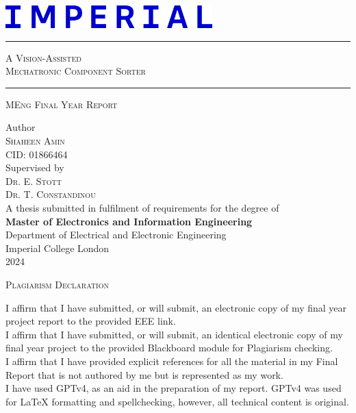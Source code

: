 \documentclass[12pt, a4paper]{article}
\begin{document}
\begin{titlepage}
  \noindent
  \includegraphics[width=80mm]{imgs/icl_logo.png}

  \centering
  \vspace{3.5cm}

  \rule{\textwidth}{0.5pt}
  \huge \textsc{A Vision-Assisted\\Mechatronic Component Sorter}
  \rule{\textwidth}{0.5pt}

  \vspace{1cm}
  \LARGE \textsc{MEng Final Year Report}
  
  \vspace{3cm}
  \large  Author\\
  \Large  \textsc{Shaheen Amin}\\
  \Large CID: 01866464\\

  \vspace{1.5cm}
  \large Supervised by\\
  \Large \textsc{Dr. E. Stott}\\
  \Large \textsc{Dr. T. Constandinou}\\

  \vfill
  \normalsize
  A thesis submitted in fulfilment of requirements for the degree of\\
  \textbf{Master of Electronics and Information Engineering}\\
  
  \vspace{0.5cm}
  \normalsize
  Department of Electrical and Electronic Engineering\\
  Imperial College London\\
  2024
  \vspace{1cm}
\end{titlepage}

\newpage
\vspace*{\fill}
\begin{center}
  \large\textsc{Plagiarism Declaration}\\
\end{center}
\noindent I affirm that I have submitted, or will submit, an electronic copy of my final year project report to the provided EEE link.\\
\noindent I affirm that I have submitted, or will submit, an identical electronic copy of my final year project to the provided Blackboard module for Plagiarism checking.\\
\noindent I affirm that I have provided explicit references for all the material in my Final Report that is not authored by me but is represented as my work.\\
\noindent I have used GPTv4, as an aid in the preparation of my report. GPTv4 was used for LaTeX formatting and spellchecking, however, all technical content is original.\\
\vspace*{\fill}
\end{document}
